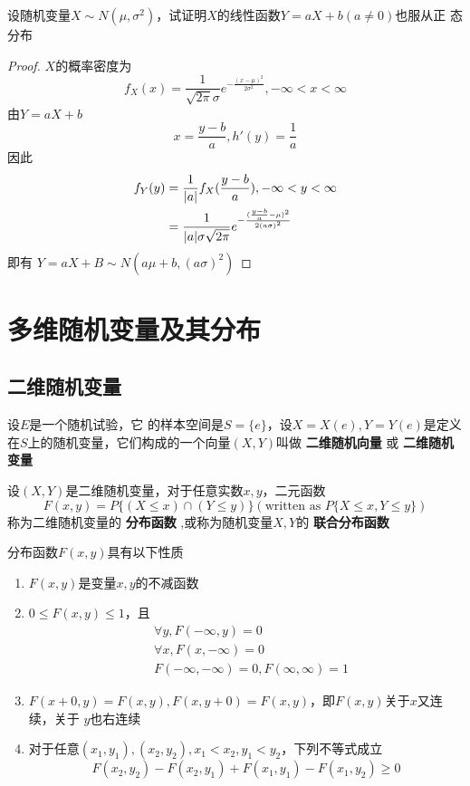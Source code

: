 \documentclass[11pt]{article}
\begin{document}
\begin{proposition}[]
设随机变量\(X\sim N(\mu,\sigma^2)\)，试证明\(X\)的线性函数\(Y=aX+b(a\neq0)\)也服从正
态分布
\end{proposition}

\begin{proof}
\(X\)的概率密度为
\begin{equation*}
f_X(x)=\frac{1}{\sqrt{2\pi}\sigma}e^{-\frac{(x-\mu)^2}{2\sigma^2}},-\infty<x<\infty
\end{equation*}
由\(Y=aX+b\)
\begin{equation*}
x=\frac{y-b}{a},h'(y)=\frac{1}{a}
\end{equation*}
因此
\begin{align*}
f_Y(y)&=\frac{1}{\abs{a}}f_X(\frac{y-b}{a}),-\infty<y<\infty\\
&=\frac{1}{\abs{a}\sigma\sqrt{2\pi}}e^{
-\frac{(\frac{y-b}{a}-\mu)^2}{2(a\sigma)^2}}
\end{align*}
即有 \(Y=aX+B\sim N(a\mu+b,(a\sigma)^2)\)
\end{proof}
\section{多维随机变量及其分布}
\label{sec:org6e6468f}
\subsection{二维随机变量}
\label{sec:org1a3f656}
设\(E\)是一个随机试验，它 的样本空间是\(S=\{e\}\)，设\(X=X(e),Y=Y(e)\)是定义
在\(S\)上的随机变量，它们构成的一个向量\((X,Y)\)叫做 \textbf{二维随机向量} 或 \textbf{二维随机
变量}

\begin{definition}[]
设\((X,Y)\)是二维随机变量，对于任意实数\(x,y\)，二元函数
\begin{equation*}
F(x,y)=P\{(X\le x)\cap(Y\le y)\}(\text{written as }P\{X\le x,Y\le y\})
\end{equation*}
称为二维随机变量的 \textbf{分布函数} ,或称为随机变量\(X,Y\)的 \textbf{联合分布函数}
\end{definition}

分布函数\(F(x,y)\)具有以下性质
\begin{enumerate}
\item \(F(x,y)\)是变量\(x,y\)的不减函数
\item \(0\le F(x,y)\le 1\)，且
\begin{align*}
&\forall y,F(-\infty,y)=0\\
&\forall x,F(x,-\infty)=0\\
&F(-\infty,-\infty)=0,F(\infty,\infty)=1
\end{align*}
\item \(F(x+0,y)=F(x,y),F(x,y+0)=F(x,y)\)，即\(F(x,y)\)关于\(x\)又连续，关于
\(y\)也右连续
\item 对于任意\((x_1,y_1),(x_2,y_2),x_1<x_2,y_1<y_2\)，下列不等式成立
\begin{equation*}
F(x_2,y_2)-F(x_2,y_1)+F(x_1,y_1)-F(x_1,y_2)\ge0
\end{equation*}
\end{enumerate}
\end{document}
